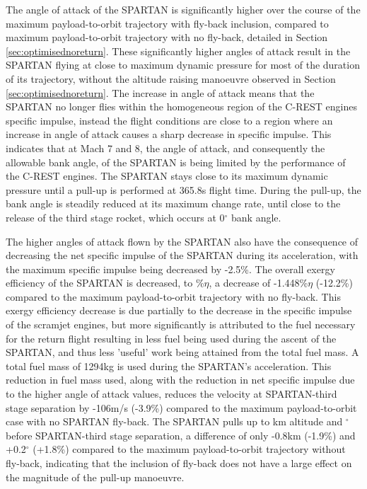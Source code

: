 The angle of attack of the SPARTAN is significantly higher over the course of the maximum payload-to-orbit trajectory with fly-back inclusion, compared to maximum payload-to-orbit trajectory with no fly-back, detailed in Section \ref{sec:optimisednoreturn}. 
 These significantly higher angles of attack result in the SPARTAN flying at close to maximum dynamic pressure for most of the duration of its trajectory, without the altitude raising manoeuvre observed in Section \ref{sec:optimisednoreturn}.
 The increase in angle of attack means that the SPARTAN no longer flies within the homogeneous region of the C-REST engines specific impulse, instead the flight conditions are close to a region where an increase in angle of attack causes a sharp decrease in specific impulse. 
This indicates that at Mach 7 and 8, the angle of attack, and consequently the allowable bank angle, of the SPARTAN is being limited by the performance of the C-REST engines. 
 The SPARTAN stays close to its maximum dynamic pressure until a pull-up is performed at 365.8s flight time. During the pull-up, the bank angle is steadily reduced at its maximum change rate, until close to the release of the third stage rocket, which occurs at 0$^\circ$ bank angle. 

The higher angles of attack flown by the SPARTAN also have the consequence of decreasing the net specific impulse of the SPARTAN during its acceleration, with the maximum specific impulse being decreased by -2.5\%.
The overall exergy efficiency of the SPARTAN is decreased, to \secondExergyEffStandard\%$\eta$, a decrease of -1.448\%$\eta$ (-12.2\%) compared to the maximum payload-to-orbit trajectory with no fly-back. This exergy efficiency decrease is due partially to the decrease in the specific impulse of the scramjet engines, but more significantly is attributed to the fuel necessary for the return flight resulting in less fuel being used during the ascent of the SPARTAN, and thus less 'useful' work being attained from the total fuel mass.
A total fuel mass of 1294kg is used during the SPARTAN's acceleration. This reduction in fuel mass used, along with the reduction in net specific impulse due to the higher angle of attack values, reduces the velocity at SPARTAN-third stage separation by -106m/s (-3.9\%) compared to the maximum payload-to-orbit case with no SPARTAN fly-back. The SPARTAN pulls up to \secondthirdSeparationAltStandard km altitude and \secondthirdSeparationgammaStandard $^\circ$ before SPARTAN-third stage separation, a difference of only -0.8km (-1.9\%) and +0.2$^\circ$ (+1.8\%) compared to the maximum payload-to-orbit trajectory without fly-back, indicating that the inclusion of fly-back does not have a large effect on the magnitude of the pull-up manoeuvre. 

